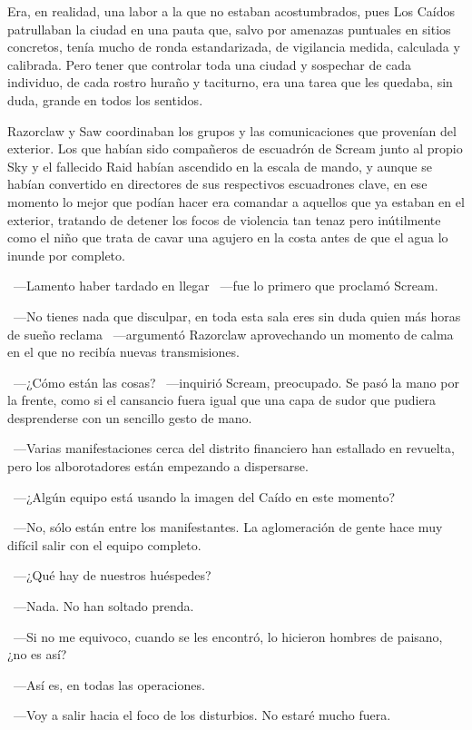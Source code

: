 Era, en realidad, una labor a la que no estaban acostumbrados, pues Los Caídos patrullaban la ciudad en una pauta que, salvo por amenazas puntuales en sitios concretos, tenía mucho de ronda estandarizada, de vigilancia medida, calculada y calibrada. Pero tener que controlar toda una ciudad y sospechar de cada individuo, de cada rostro huraño y taciturno, era una tarea que les quedaba, sin duda, grande en todos los sentidos.

Razorclaw y Saw coordinaban los grupos y las comunicaciones que provenían del exterior. Los que habían sido compañeros de escuadrón de Scream junto al propio Sky y el fallecido Raid habían ascendido en la escala de mando, y aunque se habían convertido en directores de sus respectivos escuadrones clave, en ese momento lo mejor que podían hacer era comandar a aquellos que ya estaban en el exterior, tratando de detener los focos de violencia tan tenaz pero inútilmente como el niño que trata de cavar una agujero en la costa antes de que el agua lo inunde por completo.

~---Lamento haber tardado en llegar ~---fue lo primero que proclamó Scream.

~---No tienes nada que disculpar, en toda esta sala eres sin duda quien más horas de sueño reclama ~---argumentó Razorclaw aprovechando un momento de calma en el que no recibía nuevas transmisiones.

~---¿Cómo están las cosas? ~---inquirió Scream, preocupado. Se pasó la mano por la frente, como si el cansancio fuera igual que una capa de sudor que pudiera desprenderse con un sencillo gesto de mano.

~---Varias manifestaciones cerca del distrito financiero han estallado en revuelta, pero los alborotadores están empezando a dispersarse.

~---¿Algún equipo está usando la imagen del Caído en este momento?

~---No, sólo están entre los manifestantes. La aglomeración de gente hace muy difícil salir con el equipo completo.

~---¿Qué hay de nuestros huéspedes?

~---Nada. No han soltado prenda.

~---Si no me equivoco, cuando se les encontró, lo hicieron hombres de paisano, ¿no es así?

~---Así es, en todas las operaciones.

~---Voy a salir hacia el foco de los disturbios. No estaré mucho fuera.

